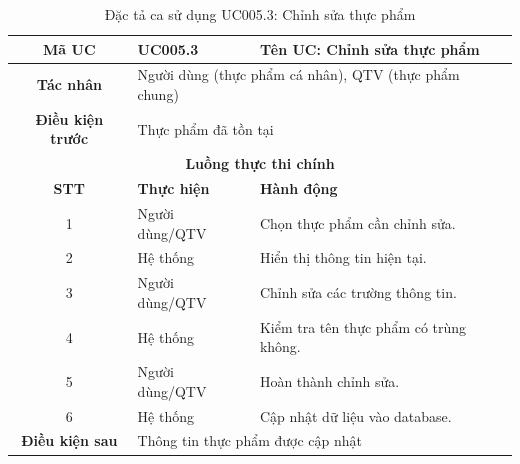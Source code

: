 \begin{table}[H]
    \centering
    \label{tab:uc005-3}
    \begin{tabularx}{\textwidth}{|c|p{3.5cm}|X|}
        \hline
        \rowcolor{headergreen} 
        \textbf{Mã UC} & \textbf{UC005.3} & \textbf{Tên UC: Chỉnh sửa thực phẩm} \\ \hline
        \textbf{Tác nhân} & \multicolumn{2}{X|}{Người dùng (thực phẩm cá nhân), QTV (thực phẩm chung)} \\ \hline
        \textbf{Điều kiện trước} & \multicolumn{2}{X|}{Thực phẩm đã tồn tại} \\ \hline
        
        \multicolumn{3}{|c|}{\cellcolor{headerorange}\textbf{Luồng thực thi chính}} \\ \hline
        \rowcolor{graybg} \textbf{STT} & \textbf{Thực hiện} & \textbf{Hành động} \\ \hline
        1 & Người dùng/QTV & Chọn thực phẩm cần chỉnh sửa. \\ \hline
        2 & Hệ thống & Hiển thị thông tin hiện tại. \\ \hline
        3 & Người dùng/QTV & Chỉnh sửa các trường thông tin. \\ \hline
        4 & Hệ thống & Kiểm tra tên thực phẩm có trùng không. \\ \hline
        5 & Người dùng/QTV & Hoàn thành chỉnh sửa. \\ \hline
        6 & Hệ thống & Cập nhật dữ liệu vào database. \\ \hline
        
        \textbf{Điều kiện sau} & \multicolumn{2}{X|}{Thông tin thực phẩm được cập nhật} \\ \hline
    \end{tabularx}
    \caption{Đặc tả ca sử dụng UC005.3: Chỉnh sửa thực phẩm}
\end{table}

